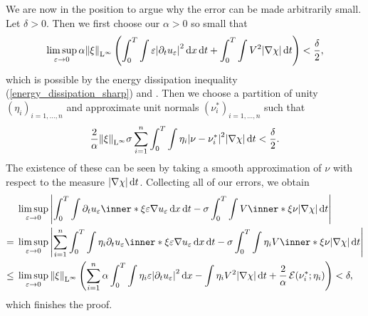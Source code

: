 We are now in the position to argue why the error can be made arbitrarily small. 
Let $ \delta > 0 $. Then we first choose our $ \alpha > 0 $ so small that 
\begin{equation*}
	\limsup_{ \varepsilon \to 0 }
	\alpha \norm{ \xi }_{ \operatorname{L}^{ \infty } }
	\left(
	\int_{ 0 }^{ T }
	\int
	\varepsilon 
	\abs{ \partial_{  t } u_{ \varepsilon } }^{ 2 }
	\dd{ x }
	\dd{ t }
	+
	\int_{ 0 }^{ T }
	\int
	V^{ 2 }
	\abs{ \nabla \chi }
	\dd{ t }
	\right)
	<
	\frac{ \delta }{ 2 },
\end{equation*}
which is possible by the energy dissipation inequality (\ref{energy_dissipation_sharp}) and .
Then we choose a partition of unity $ \left( \eta_{ i } \right)_{ i = 1 , \dotsc , n } $ and approximate unit normals $ \left( \nu^{ \ast }_{ i }\right)_{i = 1 , \dotsc, n } $ such that
\begin{equation*}
	\frac{ 2 }{ \alpha }
	\norm{ \xi }_{ \operatorname{L}^{ \infty } }
	\sigma
	\sum_{ i = 1 }^{ n }
	\int_{ 0 }^{ T }
	\int
	\eta_{ i }
	\abs{ \nu - \nu_{ i }^{ \ast } }^{ 2 }
	\abs{ \nabla \chi }
	\dd{ t }
	<
	\frac{ \delta }{2 }.
\end{equation*}
The existence of these can be seen by taking a smooth approximation of $ \nu $ with respect to the measure $ \abs{ \nabla \chi } \dd{ t } $.
Collecting all of our errors, we obtain
\begin{align*}
	& \limsup_{ \varepsilon \to 0 }
	\abs{
		\int_{ 0 }^{ T }
		\int
		\partial_{  t } u_{ \varepsilon }
		\inner*{ \xi }{ \varepsilon \nabla u_{ \varepsilon } }
		\dd{ x }
		\dd{ t }
		-
		\sigma
		\int_{ 0 }^{ T }
		\int
		V \inner*{ \xi }{ \nu }
		\abs{ \nabla \chi }
		\dd{ t }
	}
	\\
	= {} &
	\limsup_{ \varepsilon \to 0 }
	\abs{
		\sum_{ i = 1 }^{ n }
		\int_{ 0 }^{ T }
		\int
		\eta_{ i }
		\partial_{  t } u_{ \varepsilon }
		\inner*{ \xi }{ \varepsilon \nabla u_{ \varepsilon } }
		\dd{ x }
		\dd{ t }
		-
		\sigma
		\int_{ 0 }^{ T }
		\int
		\eta_{ i }
		V \inner*{ \xi }{ \nu }
		\abs{ \nabla \chi }
		\dd{ t }
	}
	\\
	\leq {} & 
	\limsup_{ \varepsilon \to 0 }
	\norm{ \xi }_{ \lp^{ \infty } }
	\left(
	\sum_{ i = 1 }^{ n } 
	\alpha \int_{ 0 }^{ T }
	\int
	\eta_{ i }
	\varepsilon
	\abs{ \partial_{  t } u_{ \varepsilon } }^{ 2 }
	\dd{ x }
	-
	\int
	\eta_{ i }
	V^{ 2 }
	\abs{ \nabla \chi }
	\dd{ t }
	+
	\frac{ 2 }{ \alpha }
	\tilt_excess ( \nu_{ i }^{ \ast } ; \eta_{ i } )
	\right)
	< \delta,
\end{align*}
which finishes the proof.